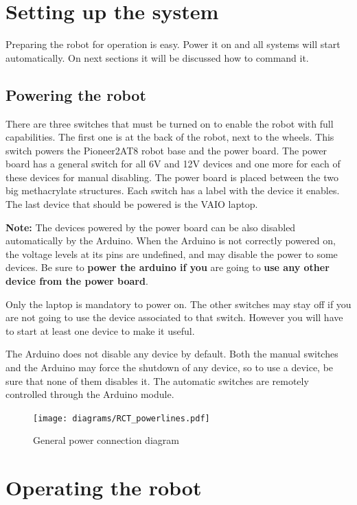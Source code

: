 \section{Setting up the system}
\label{sec:usermanual_setup}

Preparing the robot for operation is easy. Power it on and all systems will start automatically.
On next sections it will be discussed how to command it.

\subsection{Powering the robot}

There are three switches that must be turned on to enable the robot with full capabilities. The first one is
at the back of the robot, next to the wheels. This switch powers the Pioneer2AT8 robot base and the power board.
The power board has a general switch for all 6V and 12V devices and one more for each of these devices for manual disabling. The
power board is placed between the two big methacrylate structures. Each switch has a label with the device
it enables. The last device that should be powered is the VAIO laptop.

\textbf{Note:} The devices powered by the power board can be also disabled automatically by the
Arduino. When the Arduino is not correctly powered on, the voltage levels at its pins are undefined, and
may disable the power to some devices. Be sure to \textbf{power the arduino if you} are going to \textbf{use any other device
from the power board}.

Only the laptop is mandatory to power on. The other switches may stay off if you are not going to use the device
associated to that switch. However you will have to start at least one device to make it useful.

The Arduino does not disable any device by default.
Both the manual switches and the Arduino may force the shutdown of any device, so to use a device,
be sure that none of them disables it. The automatic switches are remotely controlled through the Arduino module.

\begin{figure}
\centering
 \texttt{[image: diagrams/RCT\_powerlines.pdf]}
\caption{General power connection diagram}
\label{fig:higgs_power_connections}
\end{figure}



\section{Operating the robot}
\label{sec:usermanual_operating}

